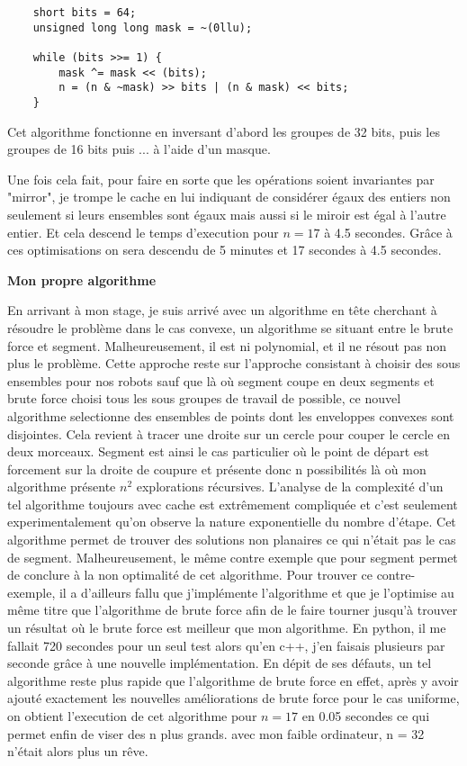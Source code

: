 \begin{verbatim}
	short bits = 64;
    unsigned long long mask = ~(0llu);

    while (bits >>= 1) {
        mask ^= mask << (bits);
        n = (n & ~mask) >> bits | (n & mask) << bits;
    }
\end{verbatim}

Cet algorithme fonctionne en inversant d'abord les groupes de 32 bits, puis les groupes de 16 bits puis ... à l'aide d'un masque.

Une fois cela fait, pour faire en sorte que les opérations soient invariantes par "mirror", je trompe le cache en lui indiquant de considérer égaux des entiers non seulement si leurs ensembles sont égaux mais aussi si le miroir est égal à l'autre entier. Et cela descend le temps d'execution pour $n = 17$ à 4.5 secondes.
Grâce à ces optimisations on sera descendu de 5 minutes et 17 secondes à 4.5 secondes.

\textbf{\Large{Mon propre algorithme}}

En arrivant à mon stage, je suis arrivé avec un algorithme en tête cherchant à résoudre le problème dans le cas convexe, un algorithme se situant entre le brute force et segment. Malheureusement, il est ni polynomial, et il ne résout pas non plus le problème. Cette approche reste sur l'approche consistant à choisir des sous ensembles pour nos robots sauf que là où segment coupe en deux segments et brute force choisi tous les sous groupes de travail de possible, ce nouvel algorithme selectionne des ensembles de points dont les enveloppes convexes sont disjointes. Cela revient à tracer une droite sur un cercle pour couper le cercle en deux morceaux. Segment est ainsi le cas particulier où le point de départ est forcement sur la droite de coupure et présente donc n possibilités là où mon algorithme présente $n^2$ explorations récursives. L'analyse de la complexité d'un tel algorithme toujours avec cache est extrêmement compliquée et c'est seulement experimentalement qu'on observe la nature exponentielle du nombre d'étape. Cet algorithme permet de trouver des solutions non planaires ce qui n'était pas le cas de segment. Malheureusement, le même contre exemple que pour segment permet de conclure à la non optimalité de cet algorithme. Pour trouver ce contre-exemple, il a d'ailleurs fallu que j'implémente l'algorithme et que je l'optimise au même titre que l'algorithme de brute force afin de le faire tourner jusqu'à trouver un résultat où le brute force est meilleur que mon algorithme. En python, il me fallait 720 secondes pour un seul test alors qu'en c++, j'en faisais plusieurs par seconde grâce à une nouvelle implémentation.
En dépit de ses défauts, un tel algorithme reste plus rapide que l'algorithme de brute force en effet, après y avoir ajouté exactement les nouvelles améliorations de brute force pour le cas uniforme, on obtient l'execution de cet algorithme pour $n = 17$ en 0.05 secondes ce qui permet enfin de viser des n plus grands. avec mon faible ordinateur, n = 32 n'était alors plus un rêve.

